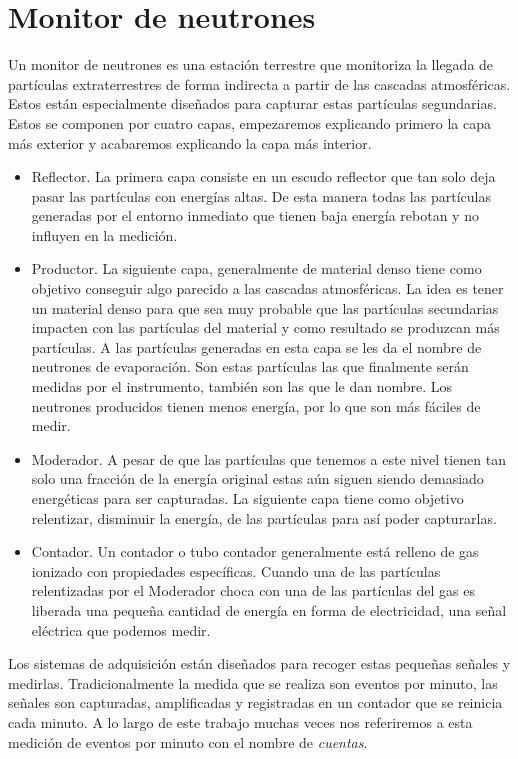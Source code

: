 \section{Monitor de neutrones}
	Un monitor de neutrones es una estación terrestre que monitoriza la llegada de partículas extraterrestres de forma indirecta a partir de las
	cascadas atmosféricas. Estos están especialmente diseñados para capturar estas partículas segundarias. Estos se componen por cuatro capas,
	empezaremos explicando primero la capa más exterior y acabaremos explicando la capa más interior.
	\begin{itemize}
		\item	Reflector. La primera capa consiste en un escudo reflector que tan solo deja pasar las partículas con energías altas. De esta
			manera todas las partículas generadas por el entorno inmediato que tienen baja energía rebotan y no influyen en la medición.
		\item	Productor. La siguiente capa, generalmente de material denso tiene como objetivo conseguir algo parecido a las cascadas
			atmosféricas. La idea es tener un material denso para que sea muy probable que las partículas secundarias impacten con las
			partículas del material y como resultado se produzcan más partículas. A las partículas generadas en esta capa se les da el
			nombre de neutrones de evaporación. Son estas partículas las que finalmente serán medidas por el instrumento, también son las
			que le dan nombre. Los neutrones producidos tienen menos energía, por lo que son más fáciles de medir.
		\item	Moderador. A pesar de que las partículas que tenemos a este nivel tienen tan solo una fracción de la energía original estas
			aún siguen siendo demasiado energéticas para ser capturadas. La siguiente capa tiene como objetivo relentizar, disminuir la
			energía, de las partículas para así poder capturarlas.
		\item	Contador. Un contador o tubo contador generalmente está relleno de gas ionizado con propiedades específicas.  Cuando una de
			las partículas relentizadas por el Moderador choca con una de las partículas del gas es liberada una pequeña cantidad de
			energía en forma de electricidad, una señal eléctrica que podemos medir. 
	\end{itemize}
 \par
Los sistemas de adquisición están diseñados para recoger estas pequeñas señales y medirlas. Tradicionalmente la medida que se realiza son eventos por
minuto, las señales son capturadas, amplificadas y registradas en un contador que se reinicia cada minuto. A lo largo de este trabajo muchas veces nos
referiremos a esta medición de eventos por minuto con el nombre de \emph{cuentas}. 


